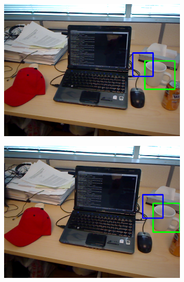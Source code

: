 \begin{figure}
	
	\begin{subfigure}[b]{0.3\textwidth}
		\includegraphics[width=\textwidth]{img/seguimiento_frame_template/frame_template-desk_1-coffee_mug_5-frame_29.png}
	\end{subfigure}
	\begin{subfigure}[b]{0.3\textwidth}
		\includegraphics[width=\textwidth]{img/seguimiento_frame_template/frame_template-desk_1-coffee_mug_5-frame_30.png}
	\end{subfigure}
	\begin{subfigure}[b]{0.3\textwidth}

\end{subfigure}
\end{figure}
